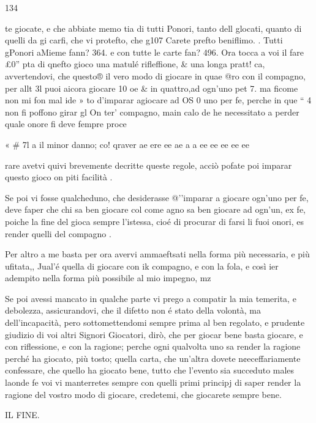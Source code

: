 \documentclass[12pt,a6paper]{article}
\begin{document}
 

134

te giocate, e che abbiate memo
tia di tutti Ponori, tanto dell
glocati, quanto di quelli da gi
carfi, che vi protefto, che g107
Carete prefto beniflimo. .
Tutti gPonori aMieme fann?
364. e con tutte le carte fan?
496. Ora tocca a voi il fare £0”
pta di qnefto gioco una matulé
rifleffione, & una longa pratt!
ca, avvertendovi, che questo®
il vero modo di giocare in quae
@ro con il compagno, per allt
3l puoi aicora giocare 10 oe
& in quattro,ad ogn’uno pet 7.
ma ficome non mi fon mal ide »
to d’imparar agiocare ad OS 0
uno per fe, perche in que “ 4
non fi poffono girar gl On ter’
compagno, main calo de he
necessitato a perder quale
onore fi deve fempre proce

« # 7l a
il minor danno; co! qraver
ae ere ee ae a a ee ee ee ee ee

rare
avetvi quivi brevemente decritte queste regole, acciò pofate poi imparar questo gioco
on piti facilità .

Se poi vi fosse qualcheduno,
che desiderasse @’'imparar a giocare ogn’uno per fe, deve faper
che chi sa ben giocare col come
agno sa ben giocare ad ogn’un,
ex fe, poiche la fine del gioca
sempre l'istessa, cioé di procurar di
farsi li fuoi onori, es
render quelli del compagno .

 Per altro a me basta per ora
avervi ammaeftsati nella forma
più necessaria, e più ufitata,,
Jual’é quella di giocare con ik 
compagno, e con la fola, e così
ier adempito nella forma più
possibile al mio impegno, mz

Se poi avessi mancato in qualche 
parte vi prego a compatir la 
mia temerita, e debolezza,
assicurandovi, che il difetto non é
stato della volontà, ma dell'incapacità,
pero sottomettendomi
sempre prima al ben regolato,
e prudente giudizio di voi
altri Signori Giocatori, dirò,
che per giocar bene basta giocare, e con riflessione, e con la
ragione; perche ogni qualvolta
uno sa render la ragione perché
ha giocato, più tosto; quella
carta, che un’altra dovete n¢eceffariamente
confessare, che
quello ha giocato bene, tutto
che l’evento sia succeduto males
laonde fe voi vi manterretes
sempre con quelli primi principj
di saper render la ragione del
vostro modo di giocare, credetemi,
che giocarete sempre bene.

IL FINE.
\end{document}
